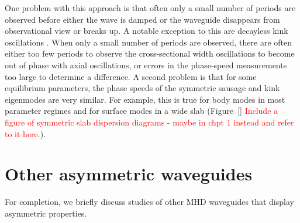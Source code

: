 \documentclass[12pt,draft]{../style-files/ociamthesis}
\begin{document}
One problem with this approach is that often only a small number of periods are observed before either the wave is damped or the waveguide disappears from observational view or breaks up. A notable exception to this are decayless kink oscillations \citep{nis_etal13}. When only a small number of periods are observed, there are often either too few periods to observe the cross-sectional width oscillations to become out of phase with axial oscillations, or errors in the phase-speed measurements too large to determine a difference. A second problem is that for some equilibrium parameters, the phase speeds of the symmetric sausage and kink eigenmodes are very similar. For example, this is true for body modes in most parameter regimes and for surface modes in a wide slab (Figure~\ref{} \textcolor{red}{Include a figure of symmetric slab dispersion diagrams - maybe in chpt 1 instead and refer to it here.}).


\section{Other asymmetric waveguides}
\label{sec: other waveguides}

For completion, we briefly discuss studies of other MHD waveguides that display asymmetric properties.
\end{document}
